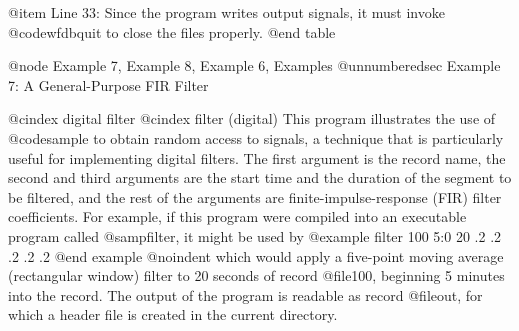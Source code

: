 {{{{{{{{{{{{{{@item Line 33:
Since the program writes output signals, it must invoke @code{wfdbquit} to
close the files properly.
@end table

@node     Example 7, Example 8, Example 6, Examples
@unnumberedsec Example 7: A General-Purpose FIR Filter

@cindex digital filter
@cindex filter (digital)
This program illustrates the use of @code{sample} to obtain random
access to signals, a technique that is particularly
useful for implementing digital filters.  The first argument is the
record name, the second and third arguments are the start time and the
duration of the segment to be filtered, and the rest of the arguments
are finite-impulse-response (FIR) filter coefficients.  For example, if
this program were compiled into an executable program called
@samp{filter}, it might be used by
@example
filter 100 5:0 20 .2 .2 .2 .2 .2
@end example
@noindent
which would apply a five-point moving average (rectangular window) filter
to 20 seconds of record @file{100}, beginning 5 minutes into the record.
The output of the program is readable as record @file{out}, for which a
header file is created in the current directory.

}}}}}}}}}}}}}}
